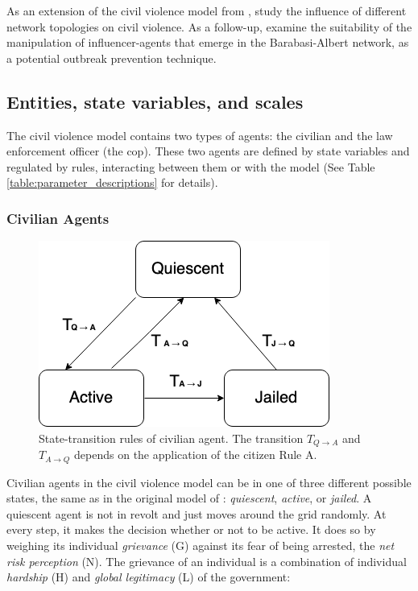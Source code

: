 \documentclass[10pt]{article}
\begin{document}
    As an extension of the civil violence model from \citet{epstein2002}, study the influence of different network topologies on civil violence. As a follow-up, examine the suitability of the manipulation of influencer-agents that emerge in the Barabasi-Albert network, as a potential outbreak prevention technique.

    \subsection{Entities, state variables, and scales}

    The civil violence model contains two types of agents: the civilian and the law
    enforcement officer (the cop). These two agents are defined by state variables and regulated by rules, interacting between them or with the model (See Table \ref{table:parameter_descriptions} for details).

    \subsubsection{Civilian Agents}
    \label{section:civilian_entity}

    \begin{figure}[h]
        \centering
        \includegraphics[width=.4\textwidth]{pictures/entities_state_variables_scales/citizen_agents/citizen_agent_2.png}
        \captionsetup{width=.4\textwidth}
        \caption{State-transition rules of civilian agent. The transition $T_{Q \rightarrow A}$ and $T_{A \rightarrow Q}$ depends on the application of the citizen Rule A.}
        \label{fig:state_transition_rule_civilian}
    \end{figure}

    Civilian agents in the civil violence model can be in one of three different possible states, the same as in the original model of \citet{epstein2002}: \emph{quiescent}, \emph{active}, or \emph{jailed}. A quiescent agent is not in revolt and just moves around the grid randomly. At every step, it makes the decision whether or not to be active. It does so by weighing its individual \emph{grievance} (G) against its fear of being arrested, the \emph{net risk perception} (N). The grievance of an individual is a combination of individual \emph{hardship} (H) and \emph{global legitimacy} (L) of the government:
\end{document}
